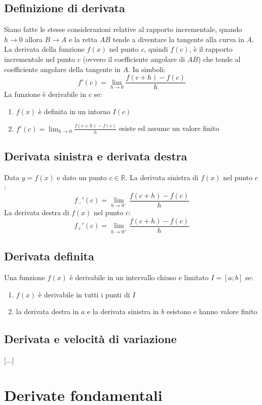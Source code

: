 \documentclass[a4paper,14pt]{extarticle}
\newcommand{\R}{\mathbb{R}}
\begin{document}
\subsection{Definizione di derivata}
Siano fatte le stesse considerazioni relative al rapporto incrementale, quando $h\to0$ allora $B\to A$ e la retta $AB$ tende a diventare la tangente alla curva in $A$. La derivata della funzione $f(x)$ nel punto $c$, quindi $f(c)$, è il rapporto incrementale nel punto $c$ (ovvero il coefficiente angolare di $AB$) che tende al coefficiente angolare della tangente in $A$.
\newline In simboli: \large \[ f'(c) = \lim_{h\to0}\frac{f(c+h)-f(c)}{h} \] \normalsize
La funzione è derivabile in $c$ se:
\begin{enumerate}
  \item $f(x)$ è definita in un intorno $I(c)$
  \item $f'(c) = \lim_{h\to0}\frac{f(c+h)-f(c)}{h}$ esiste ed assume un valore finito
\end{enumerate}

\subsection{Derivata sinistra e derivata destra}
Data $y = f(x)$ e dato un punto $c \in\R$.
\newline La derivata sinistra di $f(x)$ nel punto $c$: \[ f_-'(c) = \lim_{h\to0^-}\frac{f(c+h)-f(c)}{h}\]
\newline La derivata destra di $f(x)$ nel punto $c$: \[ f_+'(c) = \lim_{h\to0^+}\frac{f(c+h)-f(c)}{h}\]

\subsection{Derivata definita}
Una funzione $f(x)$ è derivabile in un intervallo chiuso e limitato $I=[a;b]$ se:
\begin{enumerate}
  \item $f(x)$ è derivabile in tutti i punti di $I$
  \item la derivata destra in $a$ e la derivata sinistra in $b$ esistono e hanno valore finito
\end{enumerate}

\subsection{Derivata e velocità di variazione}
[...]

\section{Derivate fondamentali}
\end{document}
